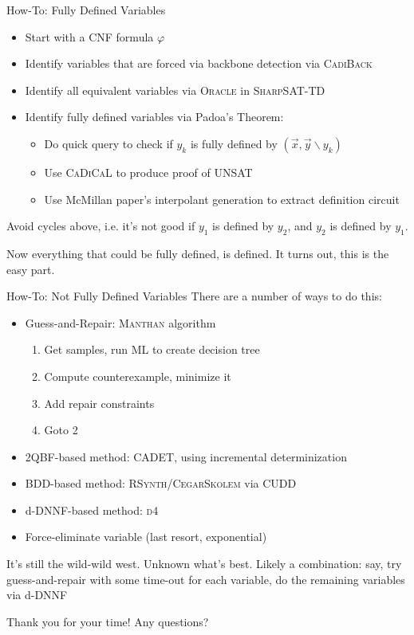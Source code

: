 \documentclass[aspectratio=169]{beamer}
\begin{document}
\begin{frame}{How-To: Fully Defined Variables}
\begin{itemize}
    \item Start with a CNF formula $ \varphi$
    \item Identify variables that are forced via backbone detection
        via \textsc{CadiBack}
    \item Identify all equivalent variables via \textsc{Oracle}
        in \textsc{SharpSAT-TD}
    \item Identify fully defined variables via Padoa's Theorem:
        \begin{itemize}
        \item Do quick query to check if $y_k$ is fully defined by $(\vec{x}, \vec{y} \backslash y_k)$
        \item Use \textsc{CaDiCaL} to produce proof of UNSAT
        \item Use McMillan paper's interpolant generation to extract definition
            circuit
        \end{itemize}
\end{itemize}
\bigskip
Avoid cycles above, i.e. it's not good if $y_1$ is defined by $y_2$, and $y_2$
is defined by $y_1$.
\bigskip

Now everything that could be fully defined, is defined. It turns out, this is
the easy part.
\end{frame}


\begin{frame}{How-To: Not Fully Defined Variables}
There are a number of ways to do this:
\begin{itemize}
    \item Guess-and-Repair: \textsc{Manthan} algorithm
        \begin{enumerate}
            \item Get samples, run ML to create decision tree
            \item Compute counterexample, minimize it
            \item Add repair constraints
            \item Goto 2
        \end{enumerate}
    \item 2QBF-based method: \textsc{CADET}, using incremental determinization
    \item BDD-based method: \textsc{RSynth}/\textsc{CegarSkolem} via \textsc{CUDD}
    \item d-DNNF-based method: \textsc{d4}
    \item Force-eliminate variable (last resort, exponential)
\end{itemize}
\bigskip

It's still the wild-wild west. Unknown what's best. Likely a combination: say,
try guess-and-repair with some time-out for each variable, do the remaining
variables via d-DNNF
\end{frame}

\begin{frame}{Thank you for your time!}
    Any questions?
\end{frame}
\end{document}
